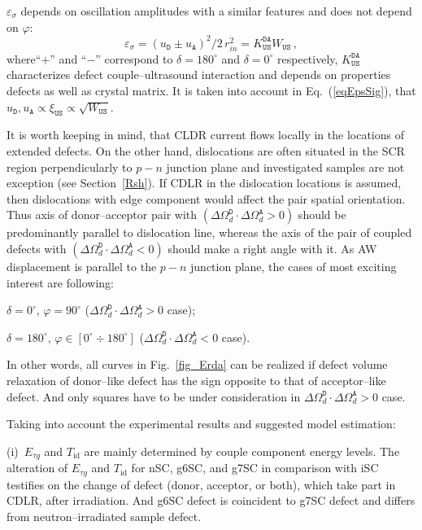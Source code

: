 \documentclass[aip,jap, amsmath,amssymb,reprint]{revtex4-1}
\begin{document}
$\varepsilon_{\sigma}$ depends on oscillation amplitudes with a similar features and
does not depend on $\varphi$:
\begin{equation}
\label{eqEpsSig}
\varepsilon_{\sigma}=(u_\mathtt{D}\pm u_\mathtt{A})^2/2\,r_{in}^2=K_\mathtt{US}^\mathtt{DA}W_{\mathtt{US}}\,,
\end{equation}
where``$+$'' and ``$-$'' correspond to $\delta=180^\circ$ and $\delta=0^\circ$ respectively,
$K_\mathtt{US}^\mathtt{DA}$ characterizes defect couple--ultrasound interaction and depends on properties defects as well as crystal matrix.
It is taken into account in Eq.~(\ref{eqEpsSig}), that $u_\mathtt{D},u_\mathtt{A}\propto \xi_\mathtt{US}\propto\sqrt{W_\mathtt{US}}$.

It is worth keeping in mind, that
CLDR current flows locally in the locations of extended defects.\cite{CDLR:JAP,CDLR:SSP}
On the other hand, dislocations are often situated in the SCR region perpendicularly to $p-n$ junction plane
and investigated samples are not exception (see Section~\ref{Rsh}).
If CDLR in the dislocation locations is assumed, then dislocations with edge component would affect the pair spatial orientation.
Thus axis of donor--acceptor pair with $(\Delta\Omega_d^\mathtt{D}\cdot\Delta\Omega_d^\mathtt{A}>0)$  should be predominantly parallel to dislocation line,
whereas the axis of the pair of coupled defects with $(\Delta\Omega_d^\mathtt{D}\cdot\Delta\Omega_d^\mathtt{A}<0)$ should make a right angle with it.
As AW displacement is parallel to the $p-n$ junction plane,
the cases of most exciting interest are following:

\noindent  $\delta=0^\circ$, $\varphi=90^\circ$ ($\Delta\Omega_d^\mathtt{D}\cdot\Delta\Omega_d^\mathtt{A}>0$ case);

\noindent  $\delta=180^\circ$, $\varphi\in[0^\circ\div 180^\circ]$ ($\Delta\Omega_d^\mathtt{D}\cdot\Delta\Omega_d^\mathtt{A}<0$ case).

\noindent
In other words, all curves in Fig.~\ref{fig_Erda} can be realized if defect volume relaxation of donor--like defect has the sign opposite to that of acceptor--like defect.
And only squares have to be under consideration in $\Delta\Omega_d^\mathtt{D}\cdot\Delta\Omega_d^\mathtt{A}>0$ case.

Taking into account the experimental results and suggested model estimation:

\noindent
(i)~$E_{\tau g}$ and $T_{\mathrm{id}}$ are mainly determined by couple component energy levels.
The alteration of $E_{\tau g}$ and $T_{\mathrm{id}}$ for nSC, g6SC, and g7SC in comparison with iSC testifies on the change of defect (donor, acceptor, or both),
which take part in CDLR, after irradiation.
And g6SC defect is coincident to g7SC defect and differs from neutron--irradiated sample defect.
\end{document}
